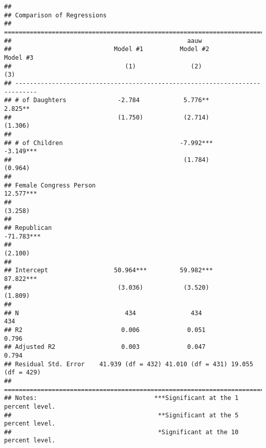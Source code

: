 \documentclass[
]{article}
\begin{document}
\begin{verbatim}
## 
## Comparison of Regressions
## ============================================================================
##                                                aauw                         
##                            Model #1          Model #2          Model #3     
##                               (1)               (2)               (3)       
## ----------------------------------------------------------------------------
## # of Daughters              -2.784            5.776**           2.825**     
##                             (1.750)           (2.714)           (1.306)     
##                                                                             
## # of Children                                -7.992***         -3.149***    
##                                               (1.784)           (0.964)     
##                                                                             
## Female Congress Person                                         12.577***    
##                                                                 (3.258)     
##                                                                             
## Republican                                                    -71.783***    
##                                                                 (2.100)     
##                                                                             
## Intercept                  50.964***         59.982***         87.822***    
##                             (3.036)           (3.520)           (1.809)     
##                                                                             
## N                             434               434               434       
## R2                           0.006             0.051             0.796      
## Adjusted R2                  0.003             0.047             0.794      
## Residual Std. Error    41.939 (df = 432) 41.010 (df = 431) 19.055 (df = 429)
## ============================================================================
## Notes:                                ***Significant at the 1 percent level.
##                                        **Significant at the 5 percent level.
##                                        *Significant at the 10 percent level.
\end{verbatim}
\end{document}
